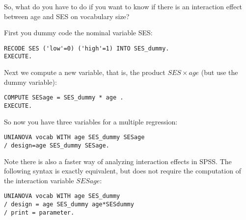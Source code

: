So, what do you have to do if you want to know if there is an interaction effect between age and SES on vocabulary size? 

First you dummy code the nominal variable SES: 


\begin{verbatim}
RECODE SES ('low'=0) ('high'=1) INTO SES_dummy.
EXECUTE.
\end{verbatim}

Next we compute a new variable, that is, the product $SES \times age$ (but use the dummy variable):


\begin{verbatim}
COMPUTE SESage = SES_dummy * age .
EXECUTE.
\end{verbatim}

So now you have three variables for a multiple regression:

\begin{verbatim}
UNIANOVA vocab WITH age SES_dummy SESage
/ design=age SES_dummy SESage.
\end{verbatim}


Note there is also a faster way of analyzing interaction effects in SPSS. The following syntax is exactly equivalent, but does not require the computation of the interaction variable $SESage$:

\begin{verbatim}
UNIANOVA vocab WITH age SES_dummy 
/ design = age SES_dummy age*SESdummy
/ print = parameter.
\end{verbatim}

